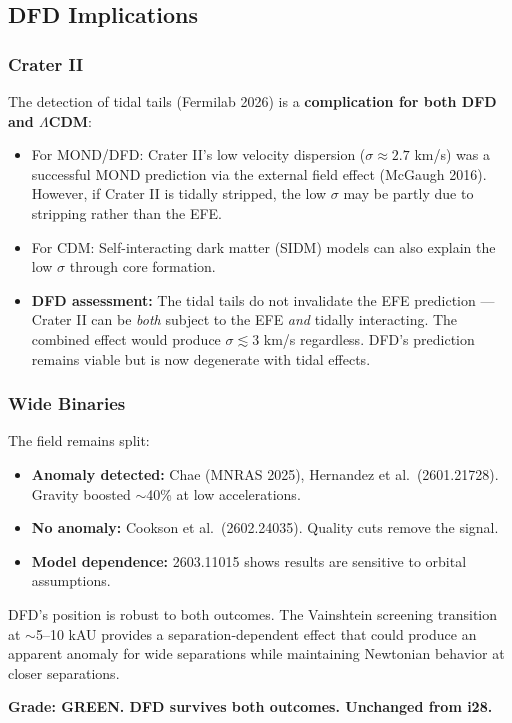 \documentclass[11pt,a4paper]{article}
\begin{document}
\subsection{DFD Implications}

\subsubsection{Crater II}
The detection of tidal tails (Fermilab 2026) is a \textbf{complication for both DFD and $\Lambda$CDM}:
\begin{itemize}
\item For MOND/DFD: Crater II's low velocity dispersion ($\sigma \approx 2.7$ km/s) was a successful MOND prediction via the external field effect (McGaugh 2016). However, if Crater II is tidally stripped, the low $\sigma$ may be partly due to stripping rather than the EFE.
\item For CDM: Self-interacting dark matter (SIDM) models can also explain the low $\sigma$ through core formation.
\item \textbf{DFD assessment:} The tidal tails do not invalidate the EFE prediction --- Crater II can be \emph{both} subject to the EFE \emph{and} tidally interacting. The combined effect would produce $\sigma \lesssim 3$ km/s regardless. DFD's prediction remains viable but is now degenerate with tidal effects.
\end{itemize}

\subsubsection{Wide Binaries}
The field remains split:
\begin{itemize}
\item \textbf{Anomaly detected:} Chae (MNRAS 2025), Hernandez et al.\ (2601.21728). Gravity boosted $\sim$40\% at low accelerations.
\item \textbf{No anomaly:} Cookson et al.\ (2602.24035). Quality cuts remove the signal.
\item \textbf{Model dependence:} 2603.11015 shows results are sensitive to orbital assumptions.
\end{itemize}

DFD's position is robust to both outcomes. The Vainshtein screening transition at $\sim$5--10 kAU provides a separation-dependent effect that could produce an apparent anomaly for wide separations while maintaining Newtonian behavior at closer separations.

\textbf{Grade: GREEN. DFD survives both outcomes. Unchanged from i28.}
\end{document}
